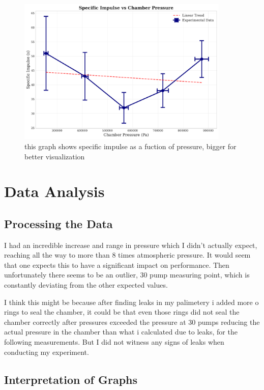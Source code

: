\documentclass[12pt,a4paper]{article}
\begin{document}
\begin{figure}[H]
\centering
\includegraphics[width=0.9\textwidth]{specific_impulse_vs_pressure.pdf}
\caption{this graph shows specific impulse as a fuction of pressure,  bigger for better visualization}
\label{fig:specific_impulse_pressure}
\end{figure}

\section{Data Analysis}

\subsection{Processing the Data}

I had an incredible increase and range in pressure which I didn't actually expect, reaching all the way to more than 8 times atmospheric pressure. It would seem that one expects this to have a significant impact on performance. Then unfortunately there seems to be an outlier, 30 pump measuring point, which is constantly deviating from the other expected values.

I think this might be because after finding leaks in my palimetery i added more o rings to seal the chamber, it could be that even those rings did not seal the chamber correctly after pressures exceeded the pressure at 30 pumps reducing the actual pressure in the chamber than what i calculated due to leaks, for the following measurements. But I did not witness any signs of leaks when conducting my experiment.

\subsection{Interpretation of Graphs}
\end{document}
